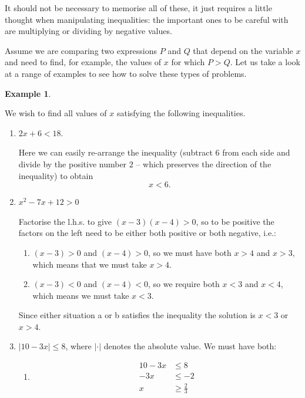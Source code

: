 \documentclass[
]{book}
\theoremstyle{definition}
\theoremstyle{definition}
\newtheorem{example}{Example}[chapter]
\theoremstyle{definition}
\theoremstyle{definition}
\theoremstyle{remark}
\begin{document}
It should not be necessary to memorise all of these, it just requires a little thought when manipulating inequalities: the important ones to be careful with are multiplying or dividing by negative values.

Assume we are comparing two expressions \(P\) and \(Q\) that depend on the variable \(x\) and need to find, for example, the values of \(x\) for which \(P>Q\). Let us take a look at a range of examples to see how to solve these types of problems.

\begin{example}
\protect\hypertarget{exm:solvineqs}{}\label{exm:solvineqs}

We wish to find all values of \(x\) satisfying the following inequalities.

\begin{enumerate}
\def\labelenumi{\arabic{enumi}.}
\item
  \(2x+6<18.\)

  Here we can easily re-arrange the inequality (subtract \(6\) from each side and divide by the positive number \(2\) -- which preserves the direction of the inequality) to obtain
  \[x<6.\]
\item
  \(x^2-7x+12>0\)

  Factorise the l.h.s. to give \((x-3)(x-4)>0\), so to be positive the factors on the left need to be either both positive or both negative, i.e.:

  \begin{enumerate}
  \def\labelenumii{\alph{enumii}.}
  \item
    \((x-3)>0\) and \((x-4)>0\), so we must have both \(x>4\) and \(x>3\), which means that we must take \(x>4\).
  \item
    \((x-3)<0\) and \((x-4)<0\), so we require both \(x<3\) and \(x<4\), which means we must take \(x<3\).
  \end{enumerate}

  Since either situation a or b satisfies the inequality the solution is \(x<3\) or \(x>4\).
\item
  \(\left|10-3x\right|\leq 8\), where \(|\cdot|\) denotes the absolute value. We must have both:

  \begin{enumerate}
  \def\labelenumii{\alph{enumii}.}
  \item
    \begin{align*}
      10-3x&\leq 8\\
      -3x&\leq-2\\
      x&\geq \frac{2}{3}
      \end{align*}


\end{enumerate}
\end{enumerate}
\end{example}
\end{document}
